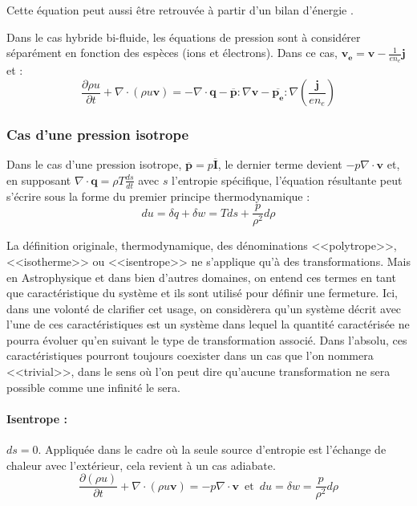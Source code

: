 Cette équation peut aussi être retrouvée à partir d'un bilan d'énergie \cite{hazeltine_local_2013}.

Dans le cas hybride bi-fluide, les équations de pression sont à considérer séparément en fonction des espèces (ions et électrons). Dans ce cas, $\mathbf{v_e} = \mathbf{v} - \frac{1}{e n_e}\mathbf{j}$ et :
\begin{equation}
\frac{\partial \rho u}{\partial t} + \nabla \cdot (\rho u \mathbf{v}) = - \nabla \cdot \mathbf{q} - \overline{\mathbf{p}} : \nabla \mathbf{v} - \overline{\mathbf{p_e}} : \nabla (\frac{\mathbf{j}}{e n_e})  \label{eq:en_int}
\end{equation}

\subsubsection{Cas d'une pression isotrope}

Dans le cas d'une pression isotrope, $\overline{\mathbf{p}} = p \overline{\mathbf{I}}$, le dernier terme devient $- p \nabla \cdot  \mathbf{v}$ et, en supposant $\nabla \cdot \mathbf{q} = \rho T \frac{ds}{dt}$ avec $s$ l'entropie spécifique, l'équation résultante peut s'écrire sous la forme du premier principe thermodynamique : 
\begin{equation}
du =  \delta q + \delta w = Tds + \frac{p}{\rho^2} d\rho
\end{equation}

La définition originale, thermodynamique, des dénominations <<polytrope>>, <<isotherme>> ou <<isentrope>> ne s’applique qu’à des transformations. Mais en Astrophysique et dans bien d’autres domaines, on entend ces termes en tant que caractéristique du système et ils sont utilisé pour définir une fermeture. Ici, dans une volonté de clarifier cet usage, on considèrera qu’un système décrit avec l’une de ces caractéristiques est un système dans lequel la quantité caractérisée ne pourra évoluer qu’en suivant le type de transformation associé. Dans l’absolu, ces caractéristiques pourront toujours coexister dans un cas que l'on nommera <<trivial>>, dans le sens où l’on peut dire qu’aucune transformation ne sera possible comme une infinité le sera.

\paragraph{Isentrope :} $d s = 0$. Appliquée dans le cadre où la seule source d'entropie est l'échange de chaleur avec l'extérieur, cela revient à un cas adiabate. 
\begin{equation}
 \frac{\partial (\rho  u)}{\partial t} +  \nabla \cdot (\rho u\mathbf{v})  = - p \nabla \cdot \mathbf{v} \, \textrm{ et } \, d u = \delta w =  \frac{p}{\rho^2} d \rho
\end{equation}


